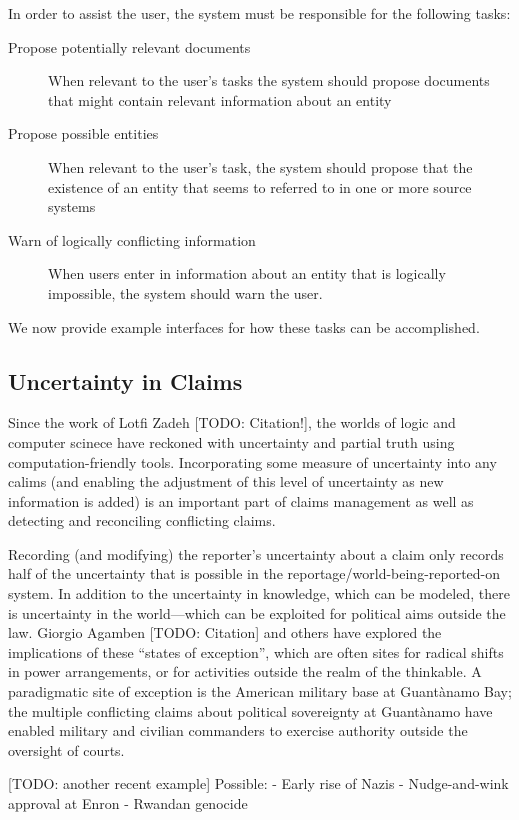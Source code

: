 \documentclass[format=siggraph, review=true]{acmart}
\begin{document}
In order to assist the user, the system must be responsible for the
following tasks:

\begin{description}
\item[Propose potentially relevant documents] When relevant to the
  user's tasks the system should propose documents that might
  contain relevant information about an entity
\item[Propose possible entities] When relevant to the user's task, the
  system should propose that the existence of an entity that seems to
  referred to in one or more source systems
\item[Warn of logically conflicting information] When users enter in
  information about an entity that is logically impossible, the system
  should warn the user.
\end{description}

We now provide example interfaces for how these tasks can be
accomplished.
  
\subsection{Uncertainty in Claims}
Since the work of Lotfi Zadeh [TODO: Citation!], the worlds of logic and computer scinece have reckoned with uncertainty and partial truth using computation-friendly tools. Incorporating some measure of uncertainty into any calims (and enabling the adjustment of this level of uncertainty as new information is added) is an important part of claims management as well as detecting and reconciling conflicting claims. 

Recording (and modifying) the reporter's uncertainty about a claim only records half of the uncertainty that is possible in the reportage/world-being-reported-on system. In addition to the uncertainty in knowledge, which can be modeled, there is uncertainty in the world—which can be exploited for political aims outside the law. Giorgio Agamben [TODO: Citation] and others have explored the implications of these ``states of exception'', which are often sites for radical shifts in power arrangements, or for activities outside the realm of the thinkable. A paradigmatic site of exception is the American military base at Guantànamo Bay; the multiple conflicting claims about political sovereignty at Guantànamo have enabled military and civilian commanders to exercise authority outside the oversight of courts. 

[TODO: another recent example] Possible: 
- Early rise of Nazis
- Nudge-and-wink approval at Enron
- Rwandan genocide
\end{document}
